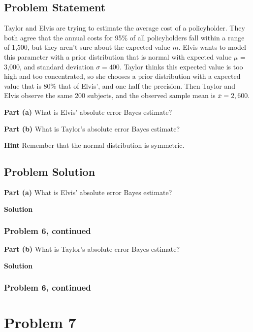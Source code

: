 \documentclass[12pt]{article}
\theoremstyle{definition}
\begin{document}
\subsection*{Problem Statement}

Taylor and Elvis are trying to estimate the average cost of a policyholder. They both agree that the annual costs for 95\% of all policyholders fall within a range of 1,500, but they aren't sure about the expected value $m$. Elvis wants to model this parameter with a prior distribution that is normal with expected value $\mu$ = 3,000, and standard deviation $\sigma = 400$. Taylor thinks this expected value is too high and too concentrated, so she chooses a prior distribution with a expected value that is 80\% that of Elvis', and one half the precision. Then Taylor and Elvis observe the same 200 subjects, and the observed sample mean is $\overline{x} = 2,600$.

\bigskip
\noindent
{\bf Part (a)} What is Elvis' absolute error Bayes estimate?

\bigskip
\noindent
{\bf Part (b)} What is Taylor's absolute error Bayes estimate?

\bigskip
\noindent
{\bf Hint} Remember that the normal distribution is symmetric.

\subsection*{Problem Solution}

\bigskip
\noindent
{\bf Part (a)} What is Elvis' absolute error Bayes estimate?

\bigskip
\noindent
{\bf Solution}


\newpage
\subsubsection*{Problem 6, continued}

\vspace{3.5in}
\noindent
{\bf Part (b)} What is Taylor's absolute error Bayes estimate?

\bigskip
\noindent
{\bf Solution}

\newpage
\subsubsection*{Problem 6, continued}




\newpage
\section*{Problem 7}
\end{document}

